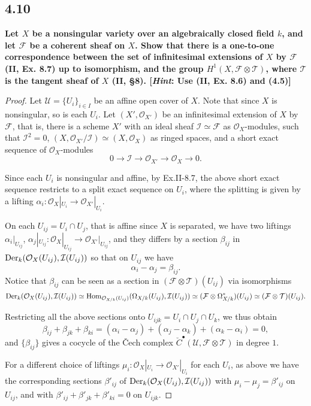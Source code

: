 \documentclass[11pt]{amsart}          %
\newcommand{\calO}{\mathcal{O}}
\newcommand{\calI}{\mathcal{I}}
\newcommand{\calF}{\mathcal{F}}
\newcommand{\calT}{\mathcal{T}}
\newcommand{\calU}{\mathcal{U}}
\newcommand{\der}{{\rm Der}}
\renewcommand{\hom}{{\rm Hom}}
\begin{document}
\subsection*{4.10}\textbf{Let $X$ be a nonsingular variety over an algebraically closed field $k$, and let $\calF$ be a coherent sheaf on $X$. Show that there is a one-to-one correspondence between the set of infinitesimal extensions of $X$ by $\calF$ (II, Ex. 8.7) up to isomorphism, and the group $H^1 (X, \calF \otimes \calT)$, where $\calT$ is the tangent sheaf of $X$ (II, \S 8). [\emph{Hint}: Use (II, Ex. 8.6) and (4.5)]}
\begin{proof} Let $\calU = \{ U_i \} _{i \in I}$ be an affine open cover of $X$. Note that since $X$ is nonsingular, so is each $U_i$. Let $(X', \calO_{X'})$ be an infinitesimal extension of $X$ by $\calF$, that is, there is a scheme $X'$ with an ideal sheaf $\calI \simeq \calF$ as $\calO_X$-modules, such that $\calI^2 = 0$, $(X, \calO_{X'}/ \calI) \simeq (X, \calO_X)$ as ringed spaces, and a short exact sequence of $\calO_X$-modules $$0 \to \calI \to \calO_{X'} \to \calO_X \to 0.$$  

Since each $U_i$ is nonsingular and affine, by Ex.II-8.7, the above short exact sequence restricts to a split exact sequence on $U_i$, where the splitting is given by a lifting $\alpha_i : \calO_X |_{U_i} \to \calO_{X'}|_{U_i}$.

On each $U_{ij}= U_i \cap U_j$, that is affine since $X$ is separated, we have two liftings $\alpha_i |_{U_{ij}}$, $\alpha_j |_{U_{ij}}: \calO_X |_{U_{ij}} \to \calO_{X'} |_{U_{ij}}$, and they differs by a section $\beta_{ij}$ in $\der_k (\calO_X (U_{ij}),\calI (U_{ij}))$ so that on $U_{ij}$ we have $$\alpha_i - \alpha_j = \beta_{ij}.$$ Notice that $\beta_{ij}$ can be seen as a section in $ (\calF \otimes \calT)(U_{ij})$ via isomorphisms
$$\der_k (\calO_X (U_{ij}), \calI(U_{ij})) \simeq \hom_{\calO_{X/k} (U_{ij})} (\Omega_{X/k} (U_{ij}) , \calI(U_{ij})) \simeq (\calF \otimes \Omega_{X/k} ^* ) (U_{ij}) \simeq (\calF \otimes \calT ) (U_{ij}).$$

Restricting all the above sections onto $U_{ijk} = U_i \cap U_j \cap U_k$, we thus obtain
$$\beta_{ij} + \beta_{jk} + \beta_{ki} = (\alpha_i - \alpha_j) + (\alpha_j - \alpha_k ) + (\alpha_k - \alpha_i) = 0,$$ and $\{ \beta_{ij} \}$ gives a cocycle of the \v{C}ech complex $\breve{C}^{\bullet} (\calU, \calF \otimes \calT)$ in degree $1$.

For a different choice of liftings $\mu_i : \calO_X |_{U_i} \to \calO_{X'} |_{U_i}$ for each $U_i$, as above we have the corresponding sections $\beta' _{ij}$ of $\der_k (\calO_X (U_{ij}), \calI (U_{ij}))$ with $\mu_i - \mu_j = \beta'_{ij}$ on $U_{ij}$, and with $\beta'_{ij} + \beta'_{jk} + \beta'_{ki} = 0$ on $U_{ijk}$.


\end{proof}
\end{document}
